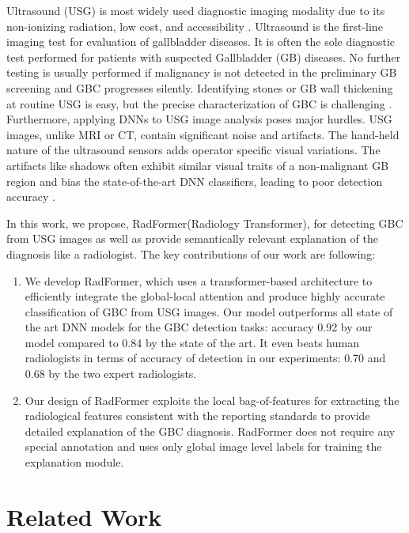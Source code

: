 \documentclass[twocolumn,final]{elsarticle}
\def\myarch{RadFormer\xspace}
\begin{document}
\par Ultrasound  (USG) is most widely used diagnostic imaging modality due to its non-ionizing radiation, low cost, and accessibility \citep{klibanov2015ultrasound}. Ultrasound is the first-line imaging test for evaluation of gallbladder diseases. It is often the sole diagnostic test performed for patients with suspected Gallbladder (GB) diseases. No further testing is usually performed if malignancy is not detected in the preliminary GB screening and GBC progresses silently. Identifying stones or GB wall thickening at routine USG is easy, but the precise characterization of GBC is challenging \citep{gupta2020imaging}. Furthermore, applying DNNs to USG image analysis poses major hurdles. USG images, unlike MRI or CT, contain significant noise and artifacts. The hand-held nature of the ultrasound sensors adds operator specific visual variations. The artifacts like shadows often exhibit similar visual traits of a non-malignant GB region and bias the state-of-the-art DNN classifiers, leading to poor detection accuracy \citep{basu2022surpassing}. 

\par In this work, we propose, \myarch (Radiology Transformer), for detecting GBC from USG images as well as provide semantically relevant explanation of the diagnosis like a radiologist. The key contributions of our work are following:
\begin{enumerate}
	\item We develop \myarch, which uses a transformer-based architecture to efficiently integrate the global-local attention and produce highly accurate classification of GBC from USG images. Our model outperforms all state of the art DNN models for the GBC detection tasks: accuracy 0.92 by our model compared to 0.84 by the state of the art. It even beats human radiologists in terms of accuracy of detection in our experiments: 0.70 and 0.68 by the two expert radiologists.
	\item Our design of \myarch exploits the local bag-of-features for extracting the radiological features consistent with the reporting standards to provide detailed explanation of the GBC diagnosis. \myarch does not require any special annotation and uses only global image level labels for training the explanation module.
\end{enumerate}

\section{Related Work}
%
\end{document}
